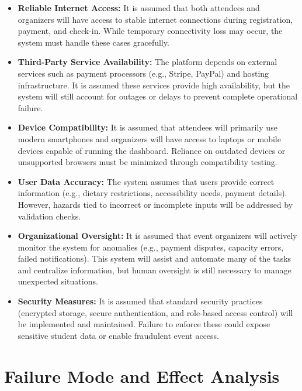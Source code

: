 \documentclass{article}
\begin{document}
\begin{itemize}
    \item \textbf{Reliable Internet Access:} It is assumed that both attendees and organizers will have access to stable internet connections during registration, payment, and check-in. While temporary connectivity loss may occur, the system must handle these cases gracefully.
    
    \item \textbf{Third-Party Service Availability:} The platform depends on external services such as payment processors (e.g., Stripe, PayPal) and hosting infrastructure. It is assumed these services provide high availability, but the system will still account for outages or delays to prevent complete operational failure.
    
    \item \textbf{Device Compatibility:} It is assumed that attendees will primarily use modern smartphones and organizers will have access to laptops or mobile devices capable of running the dashboard. Reliance on outdated devices or unsupported browsers must be minimized through compatibility testing.
    
    \item \textbf{User Data Accuracy:} The system assumes that users provide correct information (e.g., dietary restrictions, accessibility needs, payment details). However, hazards tied to incorrect or incomplete inputs will be addressed by validation checks.
    
    \item \textbf{Organizational Oversight:} It is assumed that event organizers will actively monitor the system for anomalies (e.g., payment disputes, capacity errors, failed notifications). This system will assist and automate many of the tasks and centralize information, but human oversight is still necessary to manage unexpected situations.
    
    \item \textbf{Security Measures:} It is assumed that standard security practices (encrypted storage, secure authentication, and role-based access control) will be implemented and maintained. Failure to enforce these could expose sensitive student data or enable fraudulent event access.
\end{itemize}


\section{Failure Mode and Effect Analysis}
\end{document}

